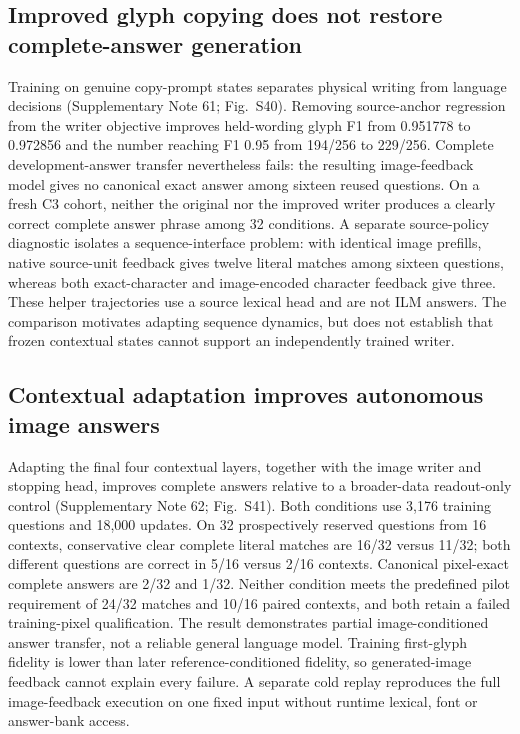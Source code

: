 \documentclass[12pt,a4paper]{article}
\begin{document}
\subsection*{Improved glyph copying does not restore complete-answer generation}
Training on genuine copy-prompt states separates physical writing from language
decisions (Supplementary Note 61; Fig.~S40). Removing source-anchor regression from the
writer objective improves held-wording glyph F1 from 0.951778 to 0.972856 and
the number reaching F1 0.95 from 194/256 to 229/256. Complete development-answer
transfer nevertheless fails: the resulting image-feedback model gives no
canonical exact answer among sixteen reused questions. On a fresh C3 cohort,
neither the original nor the improved writer produces a clearly correct
complete answer phrase among 32 conditions. A separate source-policy diagnostic
isolates a sequence-interface problem: with identical image prefills, native
source-unit feedback gives twelve literal matches among sixteen questions,
whereas both exact-character and image-encoded character feedback give three.
These helper trajectories use a source lexical head and are not ILM answers.
The comparison motivates adapting sequence dynamics, but does not establish
that frozen contextual states cannot support an independently trained writer.



\subsection*{Contextual adaptation improves autonomous image answers}
Adapting the final four contextual layers, together with the image writer and
stopping head, improves complete answers relative to a broader-data readout-only
control (Supplementary Note 62; Fig.~S41). Both conditions use 3,176 training
questions and 18,000 updates. On 32 prospectively reserved questions from 16
contexts, conservative clear complete literal matches are 16/32 versus 11/32;
both different questions are correct in 5/16 versus 2/16 contexts. Canonical
pixel-exact complete answers are 2/32 and 1/32. Neither condition meets the
predefined pilot requirement of 24/32 matches and 10/16 paired contexts, and
both retain a failed training-pixel qualification. The result demonstrates
partial image-conditioned answer transfer, not a reliable general language
model. Training first-glyph fidelity is lower than later reference-conditioned
fidelity, so generated-image feedback cannot explain every failure. A separate
cold replay reproduces the full image-feedback execution on one fixed input
without runtime lexical, font or answer-bank access.
\end{document}

